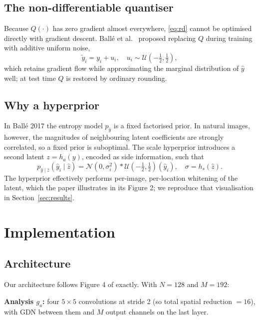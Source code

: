 \documentclass[review]{elsarticle}
\begin{document}
\subsection{The non-differentiable quantiser}
Because $Q(\cdot)$ has zero gradient almost everywhere, \eqref{eq:rd} cannot be optimised directly with gradient descent. Ball\'e et al.\ \cite{balle2017} proposed replacing $Q$ during training with additive uniform noise,
\begin{equation}
\tilde y_i = y_i + u_i, \quad u_i \sim \mathcal{U}(-\tfrac{1}{2},\tfrac{1}{2}),
\label{eq:noise}
\end{equation}
which retains gradient flow while approximating the marginal distribution of $\hat y$ well; at test time $Q$ is restored by ordinary rounding.

\subsection{Why a hyperprior}
In Ball\'e 2017 the entropy model $p_{\hat y}$ is a fixed factorised prior. In natural images, however, the magnitudes of neighbouring latent coefficients are strongly correlated, so a fixed prior is suboptimal. The scale hyperprior \cite{balle2018} introduces a second latent $z = h_a(y)$, encoded as side information, such that
\begin{equation}
p_{\hat y \mid \hat z}(\hat y_i \mid \hat z) = \mathcal{N}(0, \sigma_i^2) * \mathcal{U}(-\tfrac{1}{2},\tfrac{1}{2})(\hat y_i), \quad \sigma = h_s(\hat z).
\label{eq:conditional}
\end{equation}
The hyperprior effectively performs per-image, per-location whitening of the latent, which the paper illustrates in its Figure 2; we reproduce that visualisation in Section~\ref{sec:results}.

\section{Implementation}
\label{sec:methodology}

\subsection{Architecture}
Our architecture follows Figure 4 of \cite{balle2018} exactly. With $N=128$ and $M=192$:

\textbf{Analysis $g_a$:} four $5\times 5$ convolutions at stride 2 (so total spatial reduction $=16$), with GDN between them and $M$ output channels on the last layer.
\end{document}
